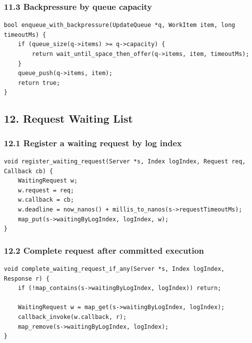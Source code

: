 \documentclass[10pt,letterpaper]{article}
\begin{document}
\subsubsection*{11.3 Backpressure by queue capacity}

\begin{verbatim}
bool enqueue_with_backpressure(UpdateQueue *q, WorkItem item, long timeoutMs) {
    if (queue_size(q->items) >= q->capacity) {
        return wait_until_space_then_offer(q->items, item, timeoutMs);
    }
    queue_push(q->items, item);
    return true;
}
\end{verbatim}

\subsection*{12. Request Waiting List}

\subsubsection*{12.1 Register a waiting request by log index}

\begin{verbatim}
void register_waiting_request(Server *s, Index logIndex, Request req, Callback cb) {
    WaitingRequest w;
    w.request = req;
    w.callback = cb;
    w.deadline = now_nanos() + millis_to_nanos(s->requestTimeoutMs);
    map_put(s->waitingByLogIndex, logIndex, w);
}
\end{verbatim}

\subsubsection*{12.2 Complete request after committed execution}

\begin{verbatim}
void complete_waiting_request_if_any(Server *s, Index logIndex, Response r) {
    if (!map_contains(s->waitingByLogIndex, logIndex)) return;

    WaitingRequest w = map_get(s->waitingByLogIndex, logIndex);
    callback_invoke(w.callback, r);
    map_remove(s->waitingByLogIndex, logIndex);
}
\end{verbatim}
\end{document}
